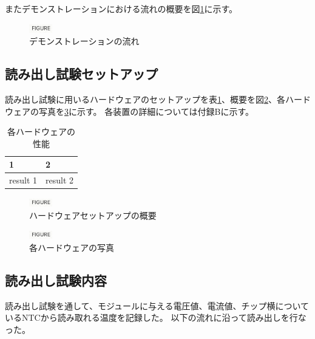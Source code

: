 またデモンストレーションにおける流れの概要を図\ref{demo_flow}に示す。

\begin{figure}[bpt]\centering
\includegraphics[width=1cm]{figure}
\caption[デモンストレーションの流れ]{デモンストレーションの流れ}
\label{demo_flow}
\end{figure}

\subsection{読み出し試験セットアップ}
読み出し試験に用いるハードウェアのセットアップを表\ref{readout_setup_table}、概要を図\ref{readout_setup_overview}、各ハードウェアの写真を\ref{readout_setup_picture}に示す。
各装置の詳細については付録Bに示す。

\begin{table}[tbp]
\begin{center}
\caption[各ハードウェアの性能]{各ハードウェアの性能}
\label{readout_setup_table}
  \begin{tabular}{|ll|} \hline
    1 & 2 \\ \hline
    result 1 & result 2 \\ \hline 
  \end{tabular}
\end{center}
\end{table}

\begin{figure}[bpt]\centering
\includegraphics[width=1cm]{figure}
\caption[ハードウェアセットアップの概要]{ハードウェアセットアップの概要}
\label{readout_setup_overview}
\end{figure}

\begin{figure}[bpt]\centering
\includegraphics[width=1cm]{figure}
\caption[各ハードウェアの写真]{各ハードウェアの写真}
\label{readout_setup_picture}
\end{figure}

\subsection{読み出し試験内容}
読み出し試験を通して、モジュールに与える電圧値、電流値、チップ横についているNTCから読み取れる温度を記録した。
以下の流れに沿って読み出しを行なった。

